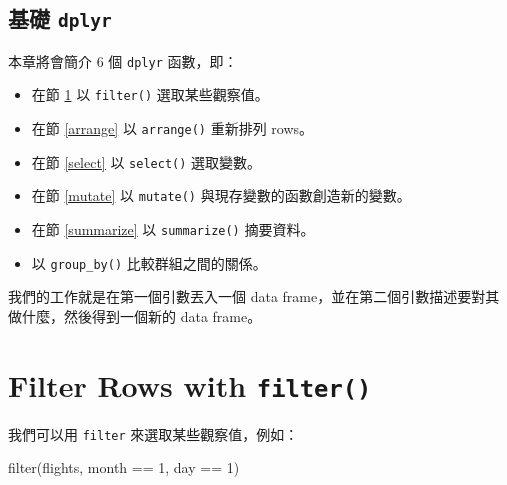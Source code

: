 \documentclass[
]{book}
\newenvironment{Shaded}{\begin{snugshade}}{\end{snugshade}}
\newcommand{\DecValTok}[1]{\textcolor[rgb]{0.00,0.00,0.81}{#1}}
\newcommand{\FunctionTok}[1]{\textcolor[rgb]{0.00,0.00,0.00}{#1}}
\newcommand{\NormalTok}[1]{#1}
\newcommand{\SpecialCharTok}[1]{\textcolor[rgb]{0.00,0.00,0.00}{#1}}
\theoremstyle{definition}
\theoremstyle{remark}
\begin{document}
\hypertarget{ux57faux790e-dplyr}{%
\subsection{\texorpdfstring{基礎 \texttt{dplyr}}{基礎 dplyr}}\label{ux57faux790e-dplyr}}

本章將會簡介 6 個 \texttt{dplyr} 函數，即：

\begin{itemize}
\item
  在節 \ref{filter} 以 \texttt{filter()} 選取某些觀察值。
\item
  在節 \ref{arrange} 以 \texttt{arrange()} 重新排列 rows。
\item
  在節 \ref{select} 以 \texttt{select()} 選取變數。
\item
  在節 \ref{mutate} 以 \texttt{mutate()} 與現存變數的函數創造新的變數。
\item
  在節 \ref{summarize} 以 \texttt{summarize()} 摘要資料。
\item
  以 \texttt{group\_by()} 比較群組之間的關係。
\end{itemize}

我們的工作就是在第一個引數丟入一個 data frame，並在第二個引數描述要對其做什麼，然後得到一個新的 data frame。

\hypertarget{filter}{%
\section{\texorpdfstring{Filter Rows with \texttt{filter()}}{Filter Rows with filter()}}\label{filter}}

我們可以用 \texttt{filter} 來選取某些觀察值，例如：

\begin{Shaded}
\begin{Highlighting}[]
\FunctionTok{filter}\NormalTok{(flights, month }\SpecialCharTok{==} \DecValTok{1}\NormalTok{, day }\SpecialCharTok{==} \DecValTok{1}\NormalTok{)}
\end{Highlighting}
\end{Shaded}
\end{document}
